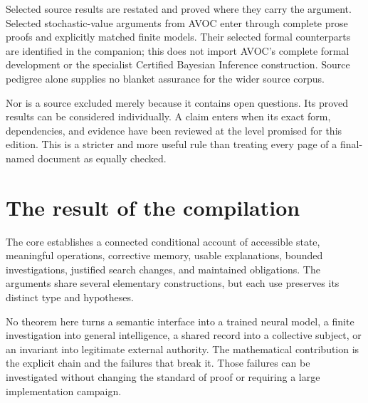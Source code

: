 \documentclass[11pt,oneside,openany]{book}
\theoremstyle{definition}\newtheorem{definition}[theorem]{Definition}
\begin{document}
Selected source results are restated and proved where they carry the argument. Selected stochastic-value arguments from AVOC enter through complete prose proofs and explicitly matched finite models. Their selected formal counterparts are identified in the companion; this does not import AVOC's complete formal development or the specialist Certified Bayesian Inference construction. Source pedigree alone supplies no blanket assurance for the wider source corpus.

Nor is a source excluded merely because it contains open questions. Its proved results can be considered individually. A claim enters when its exact form, dependencies, and evidence have been reviewed at the level promised for this edition. This is a stricter and more useful rule than treating every page of a final-named document as equally checked.

\section{The result of the compilation}
The core establishes a connected conditional account of accessible state, meaningful operations, corrective memory, usable explanations, bounded investigations, justified search changes, and maintained obligations. The arguments share several elementary constructions, but each use preserves its distinct type and hypotheses.

No theorem here turns a semantic interface into a trained neural model, a finite investigation into general intelligence, a shared record into a collective subject, or an invariant into legitimate external authority. The mathematical contribution is the explicit chain and the failures that break it. Those failures can be investigated without changing the standard of proof or requiring a large implementation campaign.

\backmatter

\end{document}
